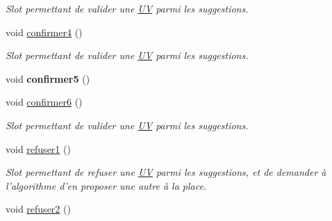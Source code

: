 \begin{DoxyCompactItemize}
\begin{DoxyCompactList}\small\item\em Slot permettant de valider une \hyperlink{class_u_v}{U\-V} parmi les suggestions. \end{DoxyCompactList}\item 
\hypertarget{class_completion_profil_window_a45c8313e38ff50eda2f2953e04ff22cb}{void \hyperlink{class_completion_profil_window_a45c8313e38ff50eda2f2953e04ff22cb}{confirmer4} ()}\label{class_completion_profil_window_a45c8313e38ff50eda2f2953e04ff22cb}

\begin{DoxyCompactList}\small\item\em Slot permettant de valider une \hyperlink{class_u_v}{U\-V} parmi les suggestions. \end{DoxyCompactList}\item 
\hypertarget{class_completion_profil_window_aebfd868d226674cb60a98cd418e9657e}{void {\bfseries confirmer5} ()}\label{class_completion_profil_window_aebfd868d226674cb60a98cd418e9657e}

\item 
\hypertarget{class_completion_profil_window_a83b5e31dcf228301a0c1ae1bf887c0c7}{void \hyperlink{class_completion_profil_window_a83b5e31dcf228301a0c1ae1bf887c0c7}{confirmer6} ()}\label{class_completion_profil_window_a83b5e31dcf228301a0c1ae1bf887c0c7}

\begin{DoxyCompactList}\small\item\em Slot permettant de valider une \hyperlink{class_u_v}{U\-V} parmi les suggestions. \end{DoxyCompactList}\item 
\hypertarget{class_completion_profil_window_a214d3561805bff336fa67967d22c0b68}{void \hyperlink{class_completion_profil_window_a214d3561805bff336fa67967d22c0b68}{refuser1} ()}\label{class_completion_profil_window_a214d3561805bff336fa67967d22c0b68}

\begin{DoxyCompactList}\small\item\em Slot permettant de refuser une \hyperlink{class_u_v}{U\-V} parmi les suggestions, et de demander à l'algorithme d'en proposer une autre à la place. \end{DoxyCompactList}\item 
\hypertarget{class_completion_profil_window_ac441db2632b8506ad4399f722b5bb159}{void \hyperlink{class_completion_profil_window_ac441db2632b8506ad4399f722b5bb159}{refuser2} ()}\label{class_completion_profil_window_ac441db2632b8506ad4399f722b5bb159}


\end{DoxyCompactItemize}
